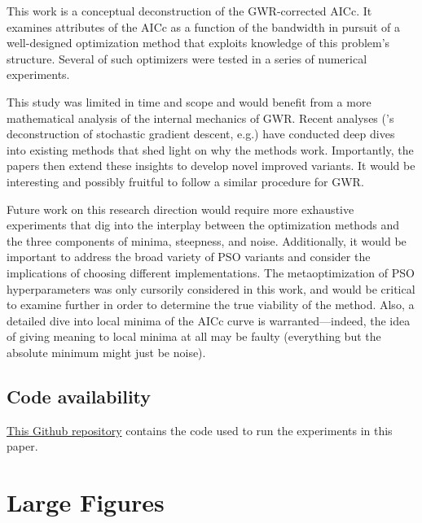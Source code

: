 \documentclass[letterpaper,12pt,twocolumn]{article}
\begin{document}
This work is a conceptual deconstruction of the GWR-corrected AICc. It examines attributes of the AICc as a function of the bandwidth in pursuit of a well-designed optimization method that exploits knowledge of this problem's structure. Several of such optimizers were tested in a series of numerical experiments.

This study was limited in time and scope and would benefit from a more mathematical analysis of the internal mechanics of GWR. Recent analyses (\cite{Feng2021}'s deconstruction of stochastic gradient descent, e.g.) have conducted deep dives into existing methods that shed light on why the methods work. Importantly, the papers then extend these insights to develop novel improved variants. It would be interesting and possibly fruitful to follow a similar procedure for GWR.

Future work on this research direction would require more exhaustive experiments that dig into the interplay between the optimization methods and the three components of minima, steepness, and noise. Additionally, it would be important to address the broad variety of PSO variants and consider the implications of choosing different implementations. The metaoptimization of PSO hyperparameters was only cursorily considered in this work, and would be critical to examine further in order to determine the true viability of the method. Also, a detailed dive into local minima of the AICc curve is warranted---indeed, the idea of giving meaning to local minima at all may be faulty (everything but the absolute minimum might just be noise).

\subsection*{Code availability}
\href{https://github.com/thoffman1/gwr-optimizers}{This Github repository} contains the code used to run the experiments in this paper.

\printbibliography
\pagebreak

\onecolumn
\section*{Large Figures}
\label{sec:figs}
\end{document}
